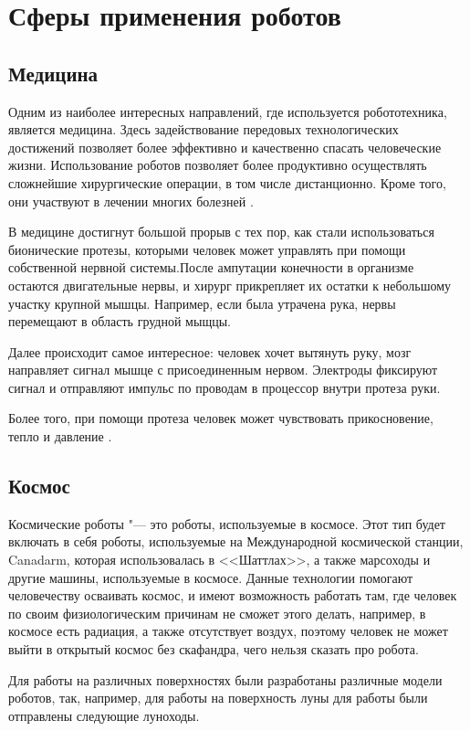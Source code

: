 \documentclass[bachelor, och, referat]{SCWorks}
\begin{document}
\section{Сферы применения роботов}

\subsection{Медицина}

Одним из наиболее интересных направлений, где используется робототехника, является медицина. Здесь задействование передовых технологических достижений позволяет более эффективно и качественно спасать человеческие жизни. Использование роботов позволяет более продуктивно осуществлять сложнейшие хирургические операции, в том числе дистанционно. Кроме того, они участвуют в лечении многих болезней \cite{6}.

В медицине достигнут большой прорыв с тех пор, как стали использоваться бионические протезы, которыми человек может управлять при помощи собственной нервной системы.После ампутации конечности в организме остаются двигательные нервы, и хирург прикрепляет их остатки к небольшому участку крупной мышцы. Например, если была утрачена рука, нервы перемещают в область грудной мыщцы.

Далее происходит самое интересное: человек хочет вытянуть руку, мозг направляет сигнал мышце с присоединенным нервом. Электроды фиксируют сигнал и отправляют импульс по проводам в процессор внутри протеза руки.

Более того, при помощи протеза человек может чувствовать прикосновение, тепло и давление \cite{7}.


\subsection{Космос}

Космические роботы "--- это роботы, используемые в космосе. Этот тип будет включать в себя роботы, используемые на Международной космической станции, Canadarm, которая использовалась в <<Шаттлах>>, а также марсоходы и другие машины, используемые в космосе. Данные технологии помогают человечеству осваивать космос, и имеют возможность работать там, где человек по своим физиологическим причинам не сможет этого делать, например, в космосе есть радиация, а также отсутствует воздух, поэтому человек не может выйти в открытый космос без скафандра, чего нельзя сказать про робота.

Для работы на различных поверхностях были разработаны различные модели роботов, так, например, для работы на поверхность луны для работы были отправлены следующие луноходы.
\end{document}

